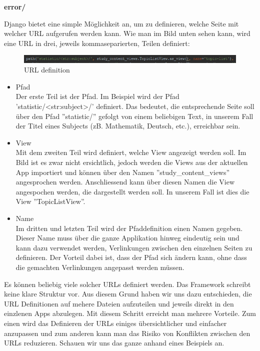 \begin{table}[h]
\begin{tabu}
		\textbf{error/} \\
	\end{tabu}
\end{table}


Django bietet eine simple Möglichkeit an, um zu definieren, welche Seite mit welcher URL aufgerufen werden kann. Wie man im Bild unten sehen kann, wird eine URL in drei, jeweils kommaseparierten, Teilen definiert:

\begin{minipage}{\textwidth}
	\begin{figure}[H]
		\includegraphics[width=\textwidth, height=\textheight, keepaspectratio]{images/URLBsp.png}
		\caption{URL definition}
	\end{figure}
\end{minipage}


\begin{itemize}
	\itemsep0em
	\item Pfad \\
	Der erste Teil ist der Pfad. Im Beispiel wird der Pfad 'statistic/<str:subject>/' definiert. Das bedeutet, die entsprechende Seite soll über den Pfad ''statistic/'' gefolgt von einem beliebigen Text, in unserem Fall der Titel eines Subjects (zB. Mathematik, Deutsch, etc.), erreichbar sein. 
	\item View \\
	Mit dem zweiten Teil wird definiert, welche View angezeigt werden soll. Im Bild ist es zwar nicht ersichtlich, jedoch werden die Views aus der aktuellen App importiert und können über den Namen ''study\_content\_views'' angesprochen werden. Anschliessend kann über diesen Namen die View angespochen werden, die dargestellt werden soll. In unserem Fall ist dies die View ''TopicListView''.
	\item Name \\
	Im dritten und letzten Teil wird der Pfaddefinition einen Namen gegeben. Dieser Name muss über die ganze Applikation hinweg eindeutig sein und kann dazu verwendet werden, Verlinkungen zwischen den einzelnen Seiten zu definieren. Der Vorteil dabei ist, dass der Pfad sich ändern kann, ohne dass die gemachten Verlinkungen angepasst werden müssen.
\end{itemize}


\noindent Es können beliebig viele solcher URLs definiert werden. Das Framework schreibt keine klare Struktur vor. Aus diesem Grund haben wir uns dazu entschieden, die URL Definitionen auf mehere Dateien aufzuteilen und jeweils direkt in den einzlenen Apps abzulegen. Mit diesem Schritt erreicht man mehrere Vorteile. Zum einen wird das Definieren der URLs einiges übersichtlicher und einfacher anzupassen und zum anderen kann man das Risiko von Konflikten zwischen den URLs reduzieren. Schauen wir uns das ganze anhand eines Beispiels an. 

